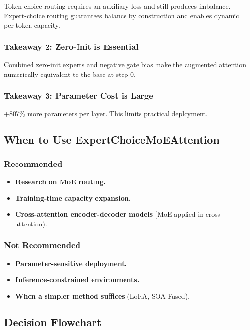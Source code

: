 Token-choice routing requires an auxiliary loss and still produces 
imbalance. Expert-choice routing guarantees balance by construction and 
enables dynamic per-token capacity.

\subsubsection{Takeaway 2: Zero-Init is Essential}

Combined zero-init experts and negative gate bias make the augmented 
attention numerically equivalent to the base at step 0.

\subsubsection{Takeaway 3: Parameter Cost is Large}

+807\% more parameters per layer. This limits practical deployment.

\subsection{When to Use ExpertChoiceMoEAttention}

\subsubsection{Recommended}
\begin{itemize}
\item \textbf{Research on MoE routing.}
\item \textbf{Training-time capacity expansion.}
\item \textbf{Cross-attention encoder-decoder models} (MoE applied in cross-attention).

\end{itemize}
\subsubsection{Not Recommended}
\begin{itemize}
\item \textbf{Parameter-sensitive deployment.}
\item \textbf{Inference-constrained environments.}
\item \textbf{When a simpler method suffices} (LoRA, SOA Fused).

\end{itemize}
\subsection{Decision Flowchart}

